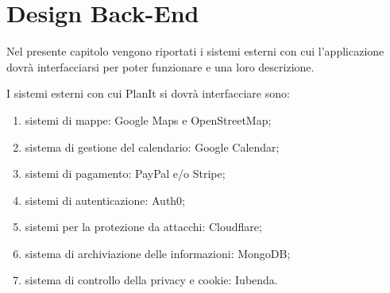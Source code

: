 \section{Design Back-End}
\label{sec:RequisitiBackEnd}

Nel presente capitolo vengono riportati i sistemi esterni con cui l'applicazione dovrà interfacciarsi per poter funzionare e una loro descrizione.

I sistemi esterni con cui PlanIt si dovrà interfacciare sono:
\begin{enumerate}
    \item sistemi di mappe: Google Maps e OpenStreetMap;
    \item sistema di gestione del calendario: Google Calendar;
    \item sistemi di pagamento: PayPal e/o Stripe;
    \item sistemi di autenticazione: Auth0;
    \item sistemi per la protezione da attacchi: Cloudflare;
    \item sistema di archiviazione delle informazioni: MongoDB;
    \item sistema di controllo della privacy e cookie: Iubenda.
\end{enumerate}

